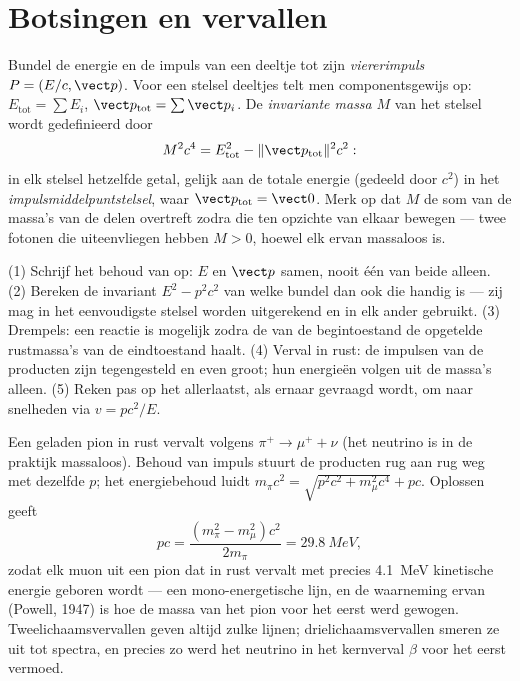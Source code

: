 \section{Botsingen en vervallen}

\begin{definition}\label{def:b3:relativistic-dynamics:four-momentum}
Bundel de energie en de impuls van een deeltje tot zijn
\emph{viererimpuls} $P = (E/c, \vect p)$. Voor een stelsel deeltjes
telt men componentsgewijs op: $E_{\text{tot}} = \sum E_i$, $\vect p_{\text{tot}} = \sum\vect p_i$. De \emph{invariante massa} $M$ van het
stelsel wordt gedefinieerd door
\[
M^2c^4 = E_{\text{tot}}^2 - \|\vect p_{\text{tot}}\|^2c^2 :
\]
in elk stelsel hetzelfde getal, gelijk aan de totale energie (gedeeld
door $c^2$) in het \emph{impulsmiddelpuntstelsel}, waar $\vect p_{\text{tot}} = \vect 0$. Merk op dat $M$ de som van de massa's van de
delen overtreft zodra die ten opzichte van elkaar bewegen --- twee
fotonen die uiteenvliegen hebben $M > 0$, hoewel elk ervan massaloos is.
\end{definition}

\begin{method}\label{met:b3:relativistic-dynamics:method}
(1) Schrijf het behoud van  op: $E$ en $\vect p$ samen, nooit
één van beide alleen. (2) Bereken de invariant $E^2 - p^2c^2$ van welke
bundel dan ook die handig is --- zij mag in het eenvoudigste stelsel
worden uitgerekend en in elk ander gebruikt. (3) Drempels: een reactie is
mogelijk zodra de  van de begintoestand de opgetelde
rustmassa's van de eindtoestand haalt. (4) Verval in rust: de impulsen
van de producten zijn tegengesteld en even groot; hun energieën volgen
uit de massa's alleen. (5) Reken pas op het allerlaatst, als ernaar
gevraagd wordt, om naar snelheden via $v = pc^2/E$.
\end{method}

\begin{example}\label{ex:b3:relativistic-dynamics:pion}
Een geladen pion in rust vervalt volgens $\pi^+ \to \mu^+ + \nu$ (het
neutrino is in de praktijk massaloos). Behoud van impuls stuurt de
producten rug aan rug weg met dezelfde $p$; het energiebehoud luidt
$m_\pi c^2 =
\sqrt{p^2c^2 + m_\mu^2c^4} + pc$. Oplossen geeft
\[
pc = \frac{(m_\pi^2 - m_\mu^2)c^2}{2m_\pi} = \qty{29.8}{MeV} ,
\]
zodat elk muon uit een pion dat in rust vervalt met precies
\qty{4.1}{MeV} kinetische energie geboren wordt --- een mono-energetische
lijn, en de waarneming ervan (Powell, 1947) is hoe de massa van het pion
voor het eerst werd gewogen. Tweelichaamsvervallen geven altijd zulke
lijnen; drielichaamsvervallen smeren ze uit tot spectra, en precies zo
werd het neutrino in het kernverval $\beta$ voor het eerst vermoed.
\end{example}

